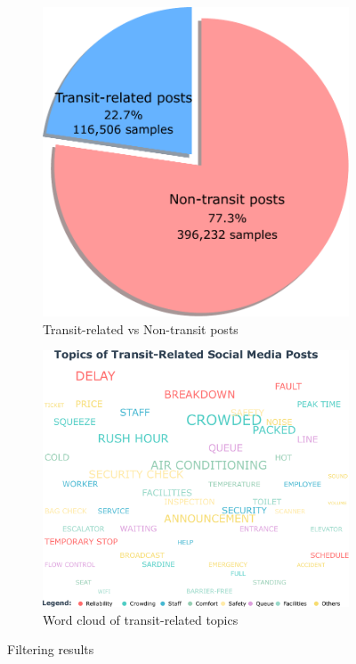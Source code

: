 \documentclass[a4paper,fleqn,12pt]{cas-sc}
\begin{document}
\begin{figure}[!ht]
\centering
\begin{subfigure}[b]{0.48\textwidth}
    \centering
    \includegraphics[width=\textwidth]{figs/filtering_results_pie_chart.pdf}
    \caption{Transit-related vs Non-transit posts}
    \label{fig:filtering_pie}
\end{subfigure}
\hfill
\begin{subfigure}[b]{0.48\textwidth}
    \centering
    \includegraphics[width=\textwidth]{figs/wordcloud.pdf}
    \caption{Word cloud of transit-related topics}
    \label{fig:wordcloud}
\end{subfigure}
\caption{Filtering results}
\label{fig:filtering_results}
\end{figure}
\end{document}
